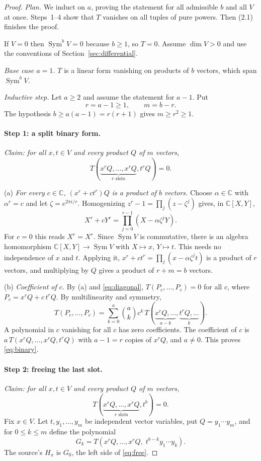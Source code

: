 \documentclass[11pt]{article}
\theoremstyle{remark}
\DeclareMathOperator{\Sym}{Sym}
\newcommand{\C}{\mathbb C}
\begin{document}
\begin{proof}
\emph{Plan.} We induct on $a$, proving the statement for all admissible $b$
and all $V$ at once. Steps~1--4 show that $T$ vanishes on all tuples of pure
powers. Then (2.1) finishes the proof.

If $V=0$ then $\Sym^bV=0$ because $b\ge1$, so $T=0$. Assume $\dim V>0$ and
use the conventions of Section~\ref{sec:differential}.

\emph{Base case $a=1$.} $T$ is a linear form vanishing on products of $b$
vectors, which span $\Sym^bV$.

\emph{Inductive step.} Let $a\ge2$ and assume the statement for $a-1$. Put
\[
 r=a-1\ge1,\qquad m=b-r .
\]
The hypothesis $b\ge a(a-1)=r(r+1)$ gives $m\ge r^2\ge1$.

\paragraph{Step 1: a split binary form.}
\emph{Claim: for all $x,t\in V$ and every product $Q$ of $m$ vectors,}
\begin{equation}\label{eq:binary}
 T(\underbrace{x^rQ,\ldots,x^rQ}_{r\text{ slots}},t^rQ)=0.
\end{equation}

(a) \emph{For every $c\in\C$, $(x^r+ct^r)Q$ is a product of $b$ vectors.}
Choose $\alpha\in\C$ with $\alpha^r=c$ and let $\zeta=e^{2\pi i/r}$.
Homogenizing $z^r-1=\prod_j(z-\zeta^j)$ gives, in $\C[X,Y]$,
\[
 X^r+cY^r=\prod_{j=0}^{r-1}(X-\alpha\zeta^jY).
\]
For $c=0$ this reads $X^r=X^r$. Since $\Sym V$ is commutative, there is an
algebra homomorphism $\C[X,Y]\to\Sym V$ with $X\mapsto x$, $Y\mapsto t$.
This needs no independence of $x$ and $t$. Applying it,
$x^r+ct^r=\prod_j(x-\alpha\zeta^jt)$ is a product of $r$ vectors, and
multiplying by $Q$ gives a product of $r+m=b$ vectors.

(b) \emph{Coefficient of $c$.} By (a) and \eqref{eq:diagonal},
$T(P_c,\ldots,P_c)=0$ for all $c$, where $P_c=x^rQ+c\,t^rQ$. By
multilinearity and symmetry,
\[
 T(P_c,\ldots,P_c)=\sum_{k=0}^{a}\binom ak c^k\,
 T(\underbrace{x^rQ,\ldots}_{a-k},\underbrace{t^rQ,\ldots}_{k}).
\]
A polynomial in $c$ vanishing for all $c$ has zero coefficients. The
coefficient of $c$ is $a\,T(x^rQ,\ldots,x^rQ,t^rQ)$ with $a-1=r$ copies of
$x^rQ$, and $a\ne0$. This proves \eqref{eq:binary}.

\paragraph{Step 2: freeing the last slot.}
\emph{Claim: for all $x,t\in V$ and every product $Q$ of $m$ vectors,}
\begin{equation}\label{eq:free}
 T(\underbrace{x^rQ,\ldots,x^rQ}_{r\text{ slots}},t^b)=0.
\end{equation}
Fix $x\in V$. Let $t,y_1,\ldots,y_m$ be independent vector variables, put
$Q=y_1\cdots y_m$, and for $0\le k\le m$ define the polynomial
\[
 G_k=T(x^rQ,\ldots,x^rQ,\;t^{b-k}y_1\cdots y_k).
\]
The source's $H_x$ is $G_0$, the left side of \eqref{eq:free}.


\end{proof}
\end{document}
